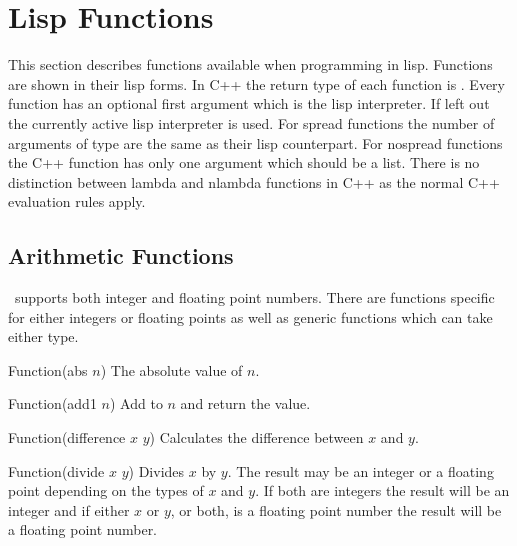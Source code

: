 %
%
%
%
%
\section{Lisp Functions}
\label{functions}
This section describes functions available when programming in lisp.
Functions are shown in their lisp forms.  In \textsf{C++} the return
type of each function is .  Every function has an optional
first argument which is the lisp interpreter.  If left out the
currently active lisp interpreter is used.  For spread functions the
number of arguments of type  are the same as their lisp
counterpart.  For nospread functions the \textsf{C++} function has
only one argument which should be a list.  There is no distinction
between lambda and nlambda functions in \textsf{C++} as the normal
\textsf{C++} evaluation rules apply.

\subsection{Arithmetic Functions}
\lips\ supports both integer and floating point numbers. There are
functions specific for either integers or floating points as well as
generic functions which can take either type.

\begin{defun}{Function}{(abs $n$)}
  The absolute value of $n$.
\end{defun}

\begin{defun}{Function}{(add1 $n$)}
  Add  to $n$ and return the value.
\end{defun}

\begin{defun}{Function}{(difference $x$ $y$)}
  Calculates the difference between $x$ and $y$.

\end{defun}

\begin{defun}{Function}{(divide $x$ $y$)}
  Divides $x$ by $y$. The result may be an integer or a floating point
  depending on the types of $x$ and $y$. If both are integers the
  result will be an integer and if either $x$ or $y$, or both, is a
  floating point number the result will be a floating point number.
\end{defun}

